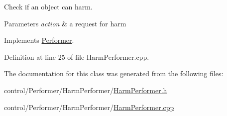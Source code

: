 Check if an object can harm. 


\begin{DoxyParams}{Parameters}
{\em action} & a request for harm \\
\hline
\end{DoxyParams}


Implements \hyperlink{classPerformer_a4cfa828ea1f9f07fd1aa9d330adfb5d5}{Performer}.



Definition at line 25 of file Harm\-Performer.\-cpp.



The documentation for this class was generated from the following files\-:\begin{DoxyCompactItemize}
\item 
control/\-Performer/\-Harm\-Performer/\hyperlink{HarmPerformer_8h}{Harm\-Performer.\-h}\item 
control/\-Performer/\-Harm\-Performer/\hyperlink{HarmPerformer_8cpp}{Harm\-Performer.\-cpp}\end{DoxyCompactItemize}
